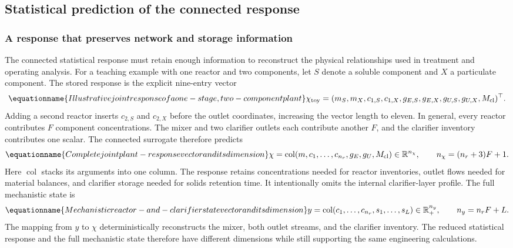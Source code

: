 \subsection{Statistical prediction of the connected response}

\subsubsection{A response that preserves network and storage information}

The connected statistical response must retain enough information to reconstruct the physical relationships used in treatment and operating analysis. For a teaching example with one reactor and two components, let $S$ denote a soluble component and $X$ a particulate component. The stored response is the explicit nine-entry vector
\begin{equation}
\equationname{Illustrative joint response of a one-stage, two-component plant}
\chi_{\rm toy}=
(m_S,m_X,c_{1,S},c_{1,X},g_{E,S},g_{E,X},g_{U,S},g_{U,X},M_{\rm cl})^\top.
\end{equation}
Adding a second reactor inserts $c_{2,S}$ and $c_{2,X}$ before the outlet coordinates, increasing the vector length to eleven. In general, every reactor contributes $F$ component concentrations. The mixer and two clarifier outlets each contribute another $F$, and the clarifier inventory contributes one scalar. The connected surrogate therefore predicts
\begin{equation}
\equationname{Complete joint plant-response vector and its dimension}
\chi=\operatorname{col}(m,c_1,\ldots,c_{n_r},g_E,g_U,M_{\rm cl})
\in\mathbb R^{n_\chi},\qquad n_\chi=(n_r+3)F+1.
\label{eq:plant_joint_response}
\end{equation}
Here $\operatorname{col}$ stacks its arguments into one column. The response retains concentrations needed for reactor inventories, outlet flows needed for material balances, and clarifier storage needed for solids retention time. It intentionally omits the internal clarifier-layer profile. The full mechanistic state is
\begin{equation}
\equationname{Mechanistic reactor-and-clarifier state vector and its dimension}
y=\operatorname{col}(c_1,\ldots,c_{n_r},s_1,\ldots,s_L)
\in\mathbb R_+^{n_y},\qquad n_y=n_rF+L.
\label{eq:plant_mechanistic_state}
\end{equation}
The mapping from $y$ to $\chi$ deterministically reconstructs the mixer, both outlet streams, and the clarifier inventory. The reduced statistical response and the full mechanistic state therefore have different dimensions while still supporting the same engineering calculations.

